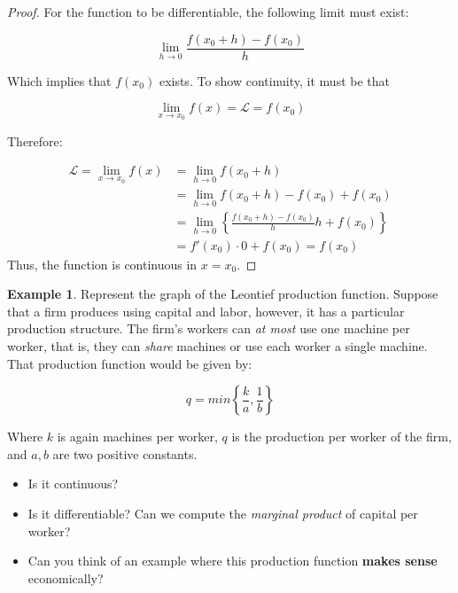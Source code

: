 \documentclass[11pt]{article}
\providecommand{\tightlist}{%
      \setlength{\itemsep}{0pt}\setlength{\parskip}{0pt}}
\theoremstyle{definition}
\newtheorem{example}{Example}
\theoremstyle{plain}
\begin{document}
\begin{proof}
For the function to be differentiable, the following
limit must exist:

\[
\lim_{h\rightarrow 0}\frac{f(x_0 + h) - f(x_0)}{h}
\]

Which implies that \(f(x_0)\) exists. To show continuity, it must be
that

\[
\lim_{x\rightarrow x_0}f(x) = \mathcal{L} = f(x_0)
\]

Therefore:

\begin{align*}
\mathcal{L} = \lim_{x\rightarrow x_0}f(x) & = \lim_{h\rightarrow 0}f(x_0 + h) \\
& = \lim_{h\rightarrow 0}f(x_0 + h)-f(x_0) + f(x_0) \\
& = \lim_{h\rightarrow 0}\left\{\frac{f(x_0+h)-f(x_0)}{h}h + f(x_0)\right\} \\
& = f'(x_0) \cdot 0 + f(x_0) = f(x_0)
\end{align*}
Thus, the function is continuous in \(x = x_0\).
\end{proof}

\begin{example}
Represent the graph of the Leontief production
function. Suppose that a firm produces using capital and labor, however,
it has a particular production structure. The firm's workers can
\emph{at most} use one machine per worker, that is, they can
\emph{share} machines or use each worker a single machine. That
production function would be given by:

\[
q = min\left\{\frac{k}{a}, \frac{1}{b}\right\}
\]

Where \(k\) is again machines per worker, \(q\) is the production per
worker of the firm, and \(a,b\) are two positive constants.

\begin{itemize}
\tightlist
\item
  Is it continuous?
\item
  Is it differentiable? Can we compute the \emph{marginal product} of
  capital per worker?
\item
  Can you think of an example where this production function
  \textbf{makes sense} economically?
\end{itemize}

    \begin{center}
    \end{center}
    { \hspace*{\fill} \\}

\end{example}
    
\end{document}
